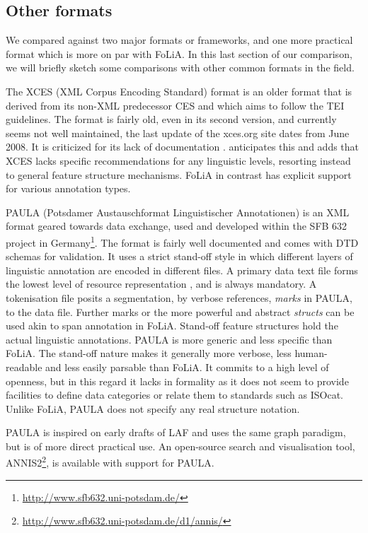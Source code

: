 \documentclass[a4paper,10pt,twoside]{article}
\begin{document}

\subsection{Other formats}

We compared against two major formats or frameworks, and one more practical format which is
more on par with FoLiA. In this last section of our comparison, we will briefly
sketch some comparisons with other common formats in the field.

The XCES (XML Corpus Encoding Standard) format is an older format that is
derived from its non-XML predecessor CES \cite{XCES} and which aims to follow
the TEI guidelines. The format is fairly old, even in its second version, and
currently seems not well maintained, the last update of the xces.org site dates
from June 2008. It is criticized for its lack of documentation
\cite{TEICORPUSANNOT}.   anticipates this and adds that XCES
lacks specific recommendations for any linguistic levels, resorting instead to
general feature structure mechanisms.  FoLiA in contrast has explicit support
for various annotation types.

PAULA (Potsdamer Austauschformat Linguistischer Annotationen) is an XML format geared towards data exchange, used and developed within the SFB 632 project in Germany\footnote{\url{http://www.sfb632.uni-potsdam.de/}}. The format is fairly well documented and comes with DTD schemas for validation. It uses a strict stand-off style in which different layers of linguistic annotation are encoded in different files. A primary data text file forms the lowest level of resource representation \cite{PAULA}, and is always mandatory. A tokenisation file posits a segmentation, by verbose references, \emph{marks} in PAULA, to the
data file. Further marks or the more powerful and abstract \emph{structs} can
be used akin to span annotation in FoLiA.  Stand-off feature structures hold
the actual linguistic annotations. PAULA is more generic and less specific than
FoLiA. The stand-off nature makes it generally more verbose, less
human-readable and less easily parsable than FoLiA. It commits to a high level
of openness, but in this regard it lacks in formality as it does not seem to
provide facilities to define data categories or relate them to standards such
as ISOcat.  Unlike FoLiA, PAULA does not specify any real structure notation.

PAULA is inspired on early drafts of LAF and uses the same graph paradigm, but
is of more direct practical use. An open-source search and visualisation tool,
ANNIS2\footnote{\url{http://www.sfb632.uni-potsdam.de/d1/annis/}}, is available
with support for PAULA.
\end{document}

